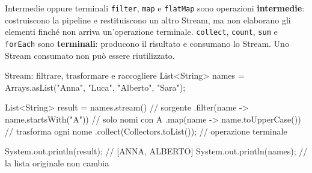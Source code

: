 ﻿\documentclass[10pt,a4paper]{article}
\newcommand{\cmd}[1]{\texttt{#1}}
\begin{document}
\begin{difference}{Intermedie oppure terminali}
\cmd{filter}, \cmd{map} e \cmd{flatMap} sono operazioni
\textbf{intermedie}: costruiscono la pipeline e restituiscono un altro Stream,
ma non elaborano gli elementi finché non arriva un'operazione terminale.
\cmd{collect}, \cmd{count}, \cmd{sum} e \cmd{forEach} sono
\textbf{terminali}: producono il risultato e consumano lo Stream.
Uno Stream consumato non può essere riutilizzato.
\end{difference}

\begin{codebox}{Stream: filtrare, trasformare e raccogliere}
List<String> names = Arrays.asList("Anna", "Luca", "Alberto", "Sara");

List<String> result = names.stream() // sorgente
    .filter(name -> name.startsWith("A")) // solo nomi con A
    .map(name -> name.toUpperCase())      // trasforma ogni nome
    .collect(Collectors.toList());       // operazione terminale

System.out.println(result); // [ANNA, ALBERTO]
System.out.println(names);  // la lista originale non cambia
\end{codebox}
\end{document}
